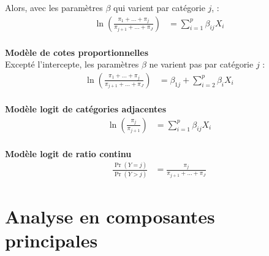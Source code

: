 \documentclass[french]{article}
\begin{document}
\begin{multicols*}{2}
Alors, avec les paramètres $\beta$ qui varient par catégorie $j$, :
\begin{align*}
	\ln\left(\frac{\pi_{1} + \hdots + \pi_{j}}{\pi_{j + 1} + \hdots + \pi_{J}}\right)
	&=	\sum_{i	=	1}^{p}\beta_{ij}X_{i}	\\
\end{align*}

\textbf{Modèle de cotes proportionnelles}	\\
Excepté l'intercepte, les paramètres $\beta$ ne varient pas par catégorie $j$ :
\begin{align*}
	\ln\left(\frac{\pi_{1} + \hdots + \pi_{j}}{\pi_{j + 1} + \hdots + \pi_{J}}\right)
	&=	\beta_{1j} + \sum_{i	=	2}^{p}\beta_{i}X_{i}	\\
\end{align*}

\textbf{Modèle logit de catégories adjacentes}
\begin{align*}
	\ln\left(\frac{\pi_{j}}{\pi_{j + 1}}\right)
	&=	\sum_{i	=	1}^{p}\beta_{ij}X_{i}	\\
\end{align*}

\textbf{Modèle logit de ratio continu}
\begin{align*}
	\frac{\Pr(Y	=	j)}{\Pr(Y	>	j)}
	&=	\frac{\pi_{j}}{\pi_{j + 1} + \hdots + \pi_{J}}
\end{align*}


\newpage	
\section{Analyse en composantes principales}\label{sec:PCA}

\newpage

\end{multicols*}
\end{document}

